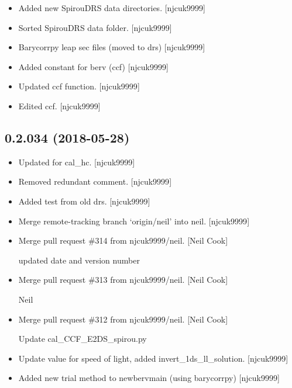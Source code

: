 \documentclass[a4paper,10pt,english]{report}
\begin{document}
\begin{itemize}
\item {} 
Added new SpirouDRS data directories. {[}njcuk9999{]}

\item {} 
Sorted SpirouDRS data folder. {[}njcuk9999{]}

\item {} 
Barycorrpy leap sec files (moved to drs) {[}njcuk9999{]}

\item {} 
Added constant for berv (ccf) {[}njcuk9999{]}

\item {} 
Updated ccf function. {[}njcuk9999{]}

\item {} 
Edited ccf. {[}njcuk9999{]}

\end{itemize}


\subsection{0.2.034 (2018-05-28)}
\label{\detokenize{misc/changelog:id427}}\begin{itemize}
\item {} 
Updated for cal\_hc. {[}njcuk9999{]}

\item {} 
Removed redundant comment. {[}njcuk9999{]}

\item {} 
Added test from old drs. {[}njcuk9999{]}

\item {} 
Merge remote-tracking branch ‘origin/neil’ into neil. {[}njcuk9999{]}

\item {} 
Merge pull request \#314 from njcuk9999/neil. {[}Neil Cook{]}

updated date and version number

\item {} 
Merge pull request \#313 from njcuk9999/neil. {[}Neil Cook{]}

Neil

\item {} 
Merge pull request \#312 from njcuk9999/neil. {[}Neil Cook{]}

Update cal\_CCF\_E2DS\_spirou.py

\item {} 
Update value for speed of light, added invert\_1ds\_ll\_solution.
{[}njcuk9999{]}

\item {} 
Added new trial method to newbervmain (using barycorrpy) {[}njcuk9999{]}

\end{itemize}
\end{document}
